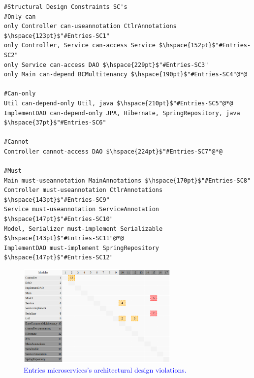 \documentclass[12pt]{article}
\begin{document}
\begin{lstlisting}[style=colorido, caption={ \textcolor{blue}{Entries microservice's architectural design specification.}},label={list:especArquiteturalEntries}
]
#Structural Design Constraints SC's
#Only-can 
only Controller can-useannotation CtlrAnnotations $\hspace{123pt}$"#Entries-SC1"
only Controller, Service can-access Service	$\hspace{152pt}$"#Entries-SC2"
only Service can-access DAO	$\hspace{229pt}$"#Entries-SC3"
only Main can-depend BCMultitenancy $\hspace{190pt}$"#Entries-SC4"@*@

#Can-only
Util can-depend-only Util, java	$\hspace{210pt}$"#Entries-SC5"@*@
ImplementDAO can-depend-only JPA, Hibernate, SpringRepository, java	$\hspace{37pt}$"#Entries-SC6"

#Cannot
Controller cannot-access DAO $\hspace{224pt}$"#Entries-SC7"@*@

#Must
Main must-useannotation MainAnnotations	$\hspace{170pt}$"#Entries-SC8"
Controller must-useannotation CtlrAnnotations $\hspace{143pt}$"#Entries-SC9"
Service must-useannotation ServiceAnnotation $\hspace{147pt}$"#Entries-SC10"
Model, Serializer must-implement Serializable $\hspace{143pt}$"#Entries-SC11"@*@
ImplementDAO must-implement SpringRepository $\hspace{147pt}$"#Entries-SC12"

\end{lstlisting}
\begin{figure}[ht]
\centering
\includegraphics[width=0.7\textwidth]{figuras/violacoesEntries.png}
\vspace{-0.2cm}
\caption{\textcolor{blue}{Entries microservices's architectural design violations.}}
\label{fig:microservices}
\end{figure}
\end{document}
